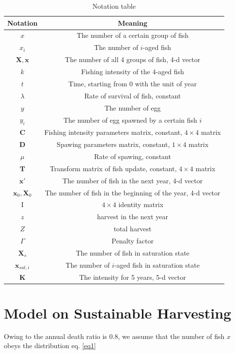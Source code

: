 \documentclass{IEEEtran}
\begin{document}
\begin{table}[h]
    \centering
    \caption{Notation table}
    \label{notations}
    \begin{tabular}{cc}
        \toprule
        Notation & Meaning \\ \midrule
        $x$ & The number of a certain group of fish \\
        $x_i$ & The number of $i$-aged fish \\
        $\bm X, \bm x$ & The number of all 4 groups of fish, 4-d vector\\
        $k$ & Fishing intensity of the 4-aged fish \\
        $t$ & Time, starting from 0 with the unit of year \\
        $\lambda$ & Rate of survival of fish, constant \\
        $y$ & The number of egg\\
        $y_i$ & The number of egg spawned by a certain fish $i$\\ 
        $\pmb C$ & Fishing intensity parameters matrix, constant, $4 \times 4$ matrix\\
        $\pmb D$ & Spawing parameters matrix, constant, $1 \times 4$ matrix\\
        $\mu$ & Rate of spawing, constant \\
        $\pmb T$ & Transform matrix of fish update, constant, $4 \times 4$ matrix\\
        $\bm x'$ & The number of fish in the next year, 4-d vector\\
        $\bm x_0, \bm X_0$ & The number of fish in the beginning of the year, 4-d vector\\
        $\mathrm I$ & $4 \times 4$ identity matrix\\
        $z$ & harvest in the next year\\
        $Z$ & total harvest\\
        $\Gamma$ & Penalty factor\\
        $\bm X_s$ & The number of fish in saturation state\\
        $\bm x_{sat,i}$ & The number of $i$-aged fish in saturation state\\
        $\bm K$ & The intensity for 5 years, 5-d vector\\
        \bottomrule
    \end{tabular}
\end{table}

\section{Model on Sustainable Harvesting} \label{model1}
Owing to the annual death ratio is 0.8, we assume that the number of fish $x$ obeys the distribution eq. \ref{eq1}
\end{document}
